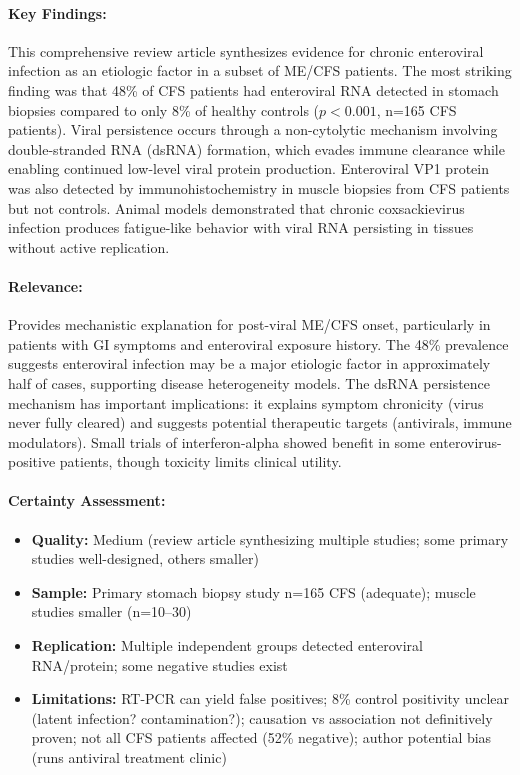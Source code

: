 \paragraph{Key Findings:}
This comprehensive review article synthesizes evidence for chronic enteroviral infection as an etiologic factor in a subset of ME/CFS patients. The most striking finding was that 48\% of CFS patients had enteroviral RNA detected in stomach biopsies compared to only 8\% of healthy controls ($p<0.001$, n=165 CFS patients). Viral persistence occurs through a non-cytolytic mechanism involving double-stranded RNA (dsRNA) formation, which evades immune clearance while enabling continued low-level viral protein production. Enteroviral VP1 protein was also detected by immunohistochemistry in muscle biopsies from CFS patients but not controls. Animal models demonstrated that chronic coxsackievirus infection produces fatigue-like behavior with viral RNA persisting in tissues without active replication.

\paragraph{Relevance:}
Provides mechanistic explanation for post-viral ME/CFS onset, particularly in patients with GI symptoms and enteroviral exposure history. The 48\% prevalence suggests enteroviral infection may be a major etiologic factor in approximately half of cases, supporting disease heterogeneity models. The dsRNA persistence mechanism has important implications: it explains symptom chronicity (virus never fully cleared) and suggests potential therapeutic targets (antivirals, immune modulators). Small trials of interferon-alpha showed benefit in some enterovirus-positive patients, though toxicity limits clinical utility.

\paragraph{Certainty Assessment:}
\begin{itemize}
    \item \textbf{Quality:} Medium (review article synthesizing multiple studies; some primary studies well-designed, others smaller)
    \item \textbf{Sample:} Primary stomach biopsy study n=165 CFS (adequate); muscle studies smaller (n=10--30)
    \item \textbf{Replication:} Multiple independent groups detected enteroviral RNA/protein; some negative studies exist
    \item \textbf{Limitations:} RT-PCR can yield false positives; 8\% control positivity unclear (latent infection? contamination?); causation vs association not definitively proven; not all CFS patients affected (52\% negative); author potential bias (runs antiviral treatment clinic)
\end{itemize}

